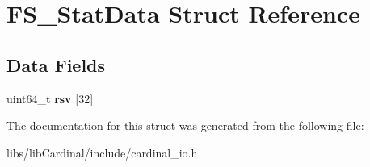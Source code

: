 \hypertarget{structFS__StatData}{}\section{F\+S\+\_\+\+Stat\+Data Struct Reference}
\label{structFS__StatData}
\subsection*{Data Fields}
\begin{DoxyCompactItemize}
\item 
uint64\+\_\+t {\bfseries rsv} \mbox{[}32\mbox{]}\hypertarget{structFS__StatData_ae40aab98816ecd0c44ced560a1bd2998}{}\label{structFS__StatData_ae40aab98816ecd0c44ced560a1bd2998}

\end{DoxyCompactItemize}


The documentation for this struct was generated from the following file\+:\begin{DoxyCompactItemize}
\item 
libs/lib\+Cardinal/include/cardinal\+\_\+io.\+h\end{DoxyCompactItemize}
